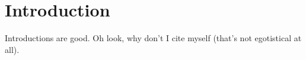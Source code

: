 \section{Introduction}

Introductions are good. Oh look, why don't I cite myself \cite{stinchfield2024mixed} (that's not egotistical at all).